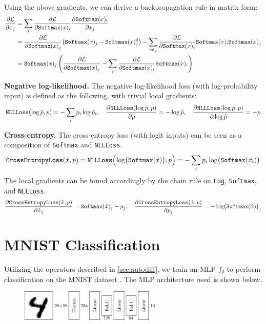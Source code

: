\documentclass{lucas-report}
\begin{document}
Using the above gradients, we can derive a backpropagation rule in matrix form:
{
  \allowdisplaybreaks
  \begin{align*}
    \pdv{\ensuremath{\mathcal{L}}}{x_j} & = \sum_i \pdv{\ensuremath{\mathcal{L}}}{\texttt{Softmax}(x)_i} \pdv{\texttt{Softmax}(x)_i}{x_j} \\
    & = \pdv{\ensuremath{\mathcal{L}}}{\texttt{Softmax}(x)_j} \bigl( \texttt{Softmax}(x)_j - \texttt{Softmax}(x)_j^2 \bigr)
    - \sum_{i \neq j } \pdv{\ensuremath{\mathcal{L}}}{\texttt{Softmax}(x)_i} \texttt{Softmax}(x)_i \texttt{Softmax}(x)_j \\
    & = \texttt{Softmax}(x)_j \left( \pdv{\ensuremath{\mathcal{L}}}{\texttt{Softmax}(x)_j} - \sum_i \pdv{\ensuremath{\mathcal{L}}}{\texttt{Softmax}(x)_i}\texttt{Softmax}(x)_i \right)
  \end{align*}
}

\textbf{Negative log-likelihood.} The negative log-likelihood loss (with log-probability input) is defined as the following,
with trivial local gradients:
\[
  \texttt{NLLLoss}(\log\hat{p}, p) = -\sum_i p_i \log \hat{p}_i, \quad
  \pdv{{\texttt{NLLLoss}(\log\hat{p}, p)}}{p} = -\log\hat{p}, \quad
  \pdv{{\texttt{NLLLoss}(\log\hat{p}, p)}}{\log\hat{p}} = -p
\]

\textbf{Cross-entropy.} The cross-entropy loss (with logit inputs) can be seen as a composition of \texttt{Softmax} and \texttt{NLLLoss}.
\[
  \texttt{CrossEntropyLoss}(\hat{x}, p) = \texttt{NLLLoss}\Bigl(\log\bigl(\texttt{Softmax}(\hat{x})\bigr), p\Bigr) = -\sum_i p_i \log \bigl(\texttt{Softmax}(\hat{x_i})\bigr)
\]
The local gradients can be found accordingly by the chain rule on \texttt{Log}, \texttt{Softmax}, and \texttt{NLLLoss}.
\[
  \begin{aligned}
    \pdv{\texttt{CrossEntropyLoss}(\hat{x}, p)}{\hat{x}_j} = \texttt{Softmax}(\hat{x})_j - p_j,
    \quad \pdv{\texttt{CrossEntropyLoss}(\hat{x}, p)}{p_j} = - \log \bigl( \texttt{Softmax}(\hat{x}) \bigr)_j
  \end{aligned}
\]

\section{MNIST Classification}

Utilizing the operators described in \autoref{sec:autodiff},
we train an MLP $f_\theta$ to perform classification on the MNIST dataset \cite{mnist}.
The MLP architecture used is shown below.
\begin{figure}[h]
  \centering
  \includegraphics[width=0.6\textwidth]{model.pdf}
\end{figure}
\end{document}
